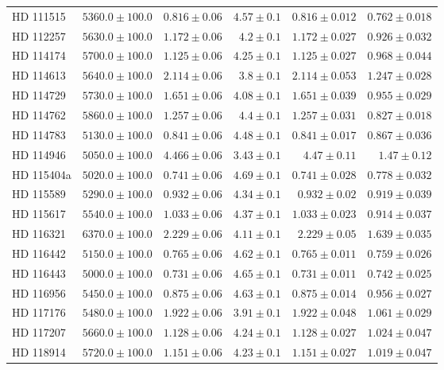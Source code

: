 \begin{longtable*}{lrrrrr}
HD 111515 & $5360.0\pm 100.0$ & $0.816\pm 0.06$ & $4.57\pm 0.1$ & $0.816\pm 0.012$ & $0.762\pm 0.018$ \\ 
HD 112257 & $5630.0\pm 100.0$ & $1.172\pm 0.06$ & $4.2\pm 0.1$ & $1.172\pm 0.027$ & $0.926\pm 0.032$ \\ 
HD 114174 & $5700.0\pm 100.0$ & $1.125\pm 0.06$ & $4.25\pm 0.1$ & $1.125\pm 0.027$ & $0.968\pm 0.044$ \\ 
HD 114613 & $5640.0\pm 100.0$ & $2.114\pm 0.06$ & $3.8\pm 0.1$ & $2.114\pm 0.053$ & $1.247\pm 0.028$ \\ 
HD 114729 & $5730.0\pm 100.0$ & $1.651\pm 0.06$ & $4.08\pm 0.1$ & $1.651\pm 0.039$ & $0.955\pm 0.029$ \\ 
HD 114762 & $5860.0\pm 100.0$ & $1.257\pm 0.06$ & $4.4\pm 0.1$ & $1.257\pm 0.031$ & $0.827\pm 0.018$ \\ 
HD 114783 & $5130.0\pm 100.0$ & $0.841\pm 0.06$ & $4.48\pm 0.1$ & $0.841\pm 0.017$ & $0.867\pm 0.036$ \\ 
HD 114946 & $5050.0\pm 100.0$ & $4.466\pm 0.06$ & $3.43\pm 0.1$ & $4.47\pm 0.11$ & $1.47\pm 0.12$ \\ 
HD 115404a & $5020.0\pm 100.0$ & $0.741\pm 0.06$ & $4.69\pm 0.1$ & $0.741\pm 0.028$ & $0.778\pm 0.032$ \\ 
HD 115589 & $5290.0\pm 100.0$ & $0.932\pm 0.06$ & $4.34\pm 0.1$ & $0.932\pm 0.02$ & $0.919\pm 0.039$ \\ 
HD 115617 & $5540.0\pm 100.0$ & $1.033\pm 0.06$ & $4.37\pm 0.1$ & $1.033\pm 0.023$ & $0.914\pm 0.037$ \\ 
HD 116321 & $6370.0\pm 100.0$ & $2.229\pm 0.06$ & $4.11\pm 0.1$ & $2.229\pm 0.05$ & $1.639\pm 0.035$ \\ 
HD 116442 & $5150.0\pm 100.0$ & $0.765\pm 0.06$ & $4.62\pm 0.1$ & $0.765\pm 0.011$ & $0.759\pm 0.026$ \\ 
HD 116443 & $5000.0\pm 100.0$ & $0.731\pm 0.06$ & $4.65\pm 0.1$ & $0.731\pm 0.011$ & $0.742\pm 0.025$ \\ 
HD 116956 & $5450.0\pm 100.0$ & $0.875\pm 0.06$ & $4.63\pm 0.1$ & $0.875\pm 0.014$ & $0.956\pm 0.027$ \\ 
HD 117176 & $5480.0\pm 100.0$ & $1.922\pm 0.06$ & $3.91\pm 0.1$ & $1.922\pm 0.048$ & $1.061\pm 0.029$ \\ 
HD 117207 & $5660.0\pm 100.0$ & $1.128\pm 0.06$ & $4.24\pm 0.1$ & $1.128\pm 0.027$ & $1.024\pm 0.047$ \\ 
HD 118914 & $5720.0\pm 100.0$ & $1.151\pm 0.06$ & $4.23\pm 0.1$ & $1.151\pm 0.027$ & $1.019\pm 0.047$ \\ 

\end{longtable*}
